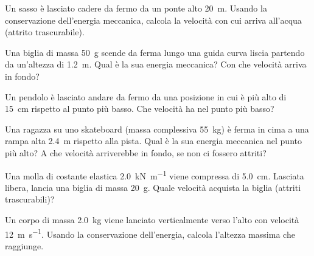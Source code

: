 \begin{esercizio}
Un sasso è lasciato cadere da fermo da un ponte alto \SI{20}{\metre}. Usando la conservazione dell'energia meccanica, calcola la velocità con cui arriva all'acqua (attrito trascurabile).\\
\end{esercizio}

\begin{esercizio}
Una biglia di massa \SI{50}{\gram} scende da ferma lungo una guida curva liscia partendo da un'altezza di \SI{1,2}{\metre}. Qual è la sua energia meccanica? Con che velocità arriva in fondo?\\
\end{esercizio}

\begin{esercizio}
Un pendolo è lasciato andare da fermo da una posizione in cui è più alto di \SI{15}{\centi\metre} rispetto al punto più basso. Che velocità ha nel punto più basso?\\
\end{esercizio}

\begin{esercizio}
Una ragazza su uno skateboard (massa complessiva \SI{55}{\kilo\gram}) è ferma in cima a una rampa alta \SI{2,4}{\metre} rispetto alla pista. Qual è la sua energia meccanica nel punto più alto? A che velocità arriverebbe in fondo, se non ci fossero attriti?\\
\end{esercizio}

\begin{esercizio}
Una molla di costante elastica \SI{2,0}{\kilo\newton\per\metre} viene compressa di \SI{5,0}{\centi\metre}. Lasciata libera, lancia una biglia di massa \SI{20}{\gram}. Quale velocità acquista la biglia (attriti trascurabili)?\\
\end{esercizio}

\begin{esercizio}
Un corpo di massa \SI{2,0}{\kilo\gram} viene lanciato verticalmente verso l'alto con velocità \SI{12}{\metre\per\second}. Usando la conservazione dell'energia, calcola l'altezza massima che raggiunge.\\
\end{esercizio}

